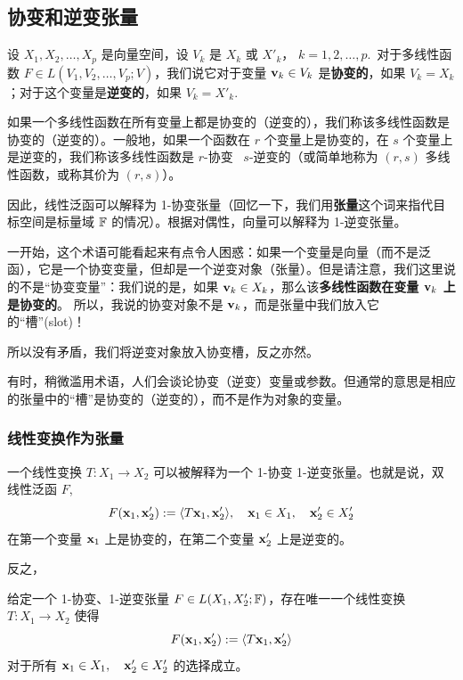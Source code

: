 \subsection{协变和逆变张量}\label{sec:08-05-03}

设 $X_1, X_2, \dots, X_p$ 是向量空间，设 $V_k$ 是 $X_k$ 或 $X'_k$， $k = 1, 2, \dots, p$.~对于多线性函数 $F \in L(V_1, V_2, \dots, V_p; V)$，我们说它对于变量 $\mathbf{v}_k \in V_k$ 是\textbf{协变的}，如果 $V_k = X_k$；对于这个变量是\textbf{逆变的}，如果 $V_k = X'_k$.~

如果一个多线性函数在所有变量上都是协变的（逆变的），我们称该多线性函数是协变的（逆变的）。一般地，如果一个函数在 $r$ 个变量上是协变的，在 $s$ 个变量上是逆变的，我们称该多线性函数是 $r$-协变~ $s$-逆变的（或简单地称为 $(r, s)$ 多线性函数，或称其价为 $(r, s)$）。

因此，线性泛函可以解释为 1-协变张量（回忆一下，我们用\textbf{张量}这个词来指代目标空间是标量域 $\mathbb{F}$ 的情况）。根据对偶性，向量可以解释为 1-逆变张量。

\begin{remark*}
一开始，这个术语可能看起来有点令人困惑：如果一个变量是向量（而不是泛函），它是一个协变变量，但却是一个逆变对象（张量）。但是请注意，我们这里说的不是“协变变量”：我们说的是，如果 $\mathbf{v}_k \in X_k$，那么该\textbf{多线性函数在变量 $\mathbf{v}_k$ 上是协变的}。
所以，我说的协变对象不是 $\mathbf{v}_k$，而是张量中我们放入它的“槽”(slot)！
\end{remark*}

所以没有矛盾，我们将逆变对象放入协变槽，反之亦然。


有时，稍微滥用术语，人们会谈论协变（逆变）变量或参数。但通常的意思是相应的张量中的“槽”是协变的（逆变的），而不是作为对象的变量。

\subsubsection{线性变换作为张量}\label{sec:08-05-03-01}
一个线性变换 $T : X_1 \to X_2$ 可以被解释为一个 1-协变 1-逆变张量。也就是说，双线性泛函 $F$,
$$F(\mathbf{x}_1, \mathbf{x}'_2) := \langle T\mathbf{x}_1, \mathbf{x}'_2 \rangle,\quad \mathbf{x}_1 \in X_1,\quad \mathbf{x}'_2 \in X'_2$$
在第一个变量 $\mathbf{x}_1$ 上是协变的，在第二个变量 $\mathbf{x}'_2$ 上是逆变的。

反之，

\begin{proposition}\label{stmt:08-05-05}
给定一个 1-协变、1-逆变张量 $F \in L(X_1, X'_2; \mathbb{F})$，存在唯一一个线性变换 $T : X_1 \to X_2$ 使得
\begin{equation}\label{eq:08-05-07}
F(\mathbf{x}_1, \mathbf{x}'_2) := \langle T\mathbf{x}_1, \mathbf{x}'_2 \rangle
\end{equation}
对于所有 $\mathbf{x}_1 \in X_1,\quad \mathbf{x}'_2 \in X'_2$ 的选择成立。
\end{proposition}

